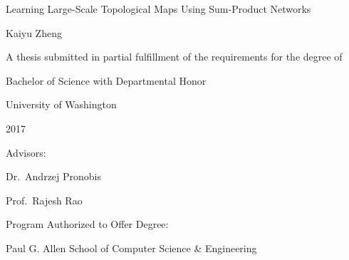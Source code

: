 \documentclass{thesis.tex}
\begin{document}
\begin{titlepage}
\centering
{}
\vspace*{\fill}
  \huge Learning Large-Scale Topological Maps Using Sum-Product Networks\normalsize

  \vspace{0.5in}

  \Large Kaiyu Zheng\large

  \vspace{1.2in}

  A thesis submitted in partial fulfillment of the requirements for the degree of

  \vspace{0.1in}

  Bachelor of Science with Departmental Honor

  \vspace{0.8in}
  University of Washington

  2017

  \vspace{0.4in}
  Advisors:

  Dr.~Andrzej Pronobis

  Prof.~Rajesh Rao

  \vspace{0.8in}
  Program Authorized to Offer Degree:

  \vspace{0.1in}

  Paul G. Allen School of Computer Science \& Engineering\normalsize
\vspace*{\fill}

\end{titlepage}
\end{document}
